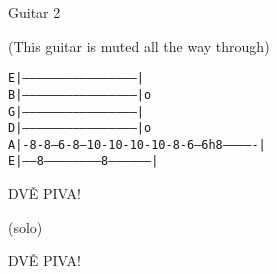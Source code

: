 

\zs
{}        

Guitar 2

(This guitar is muted all the way through) 

\texttt{E|-----------------------------------------------| }\\
\texttt{B|-----------------------------------------------|o}\\
\texttt{G|-----------------------------------------------| }\\
\texttt{D|-----------------------------------------------|o}\\
\texttt{A|-8-8---6-8---10-10-10-10-8-6---6h8-------------| }\\
\texttt{E|-----8-----------------------8-----------------| }\\
\ks

\zr
        

DVĚ PIVA!
\kr

\zs
(solo)
\ks

\zr
DVĚ PIVA!
\kr

\zs
\ks

\kp




